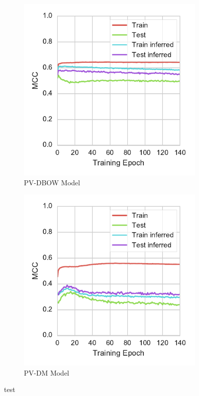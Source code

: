\begin{figure}[h!]
    \centering
    \begin{subfigure}[b]{0.49\textwidth}
      \includegraphics[width=\textwidth]{img/exp-vector-space/doc2vec_dm_0}
      \caption{PV-DBOW Model}
\label{fig:doc2vec_dm_0}
    \end{subfigure}
    \begin{subfigure}[b]{0.49\textwidth}
      \includegraphics[width=\textwidth]{img/exp-vector-space/doc2vec_dm_1}
    \caption{PV-DM Model}
\label{fig:doc2vec_dm_1}
    \end{subfigure}
  \caption{test}
\label{fig:doc2vec_doc2vec_dm}
\end{figure}


